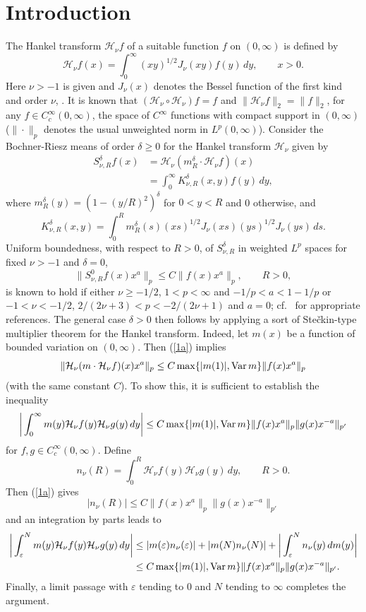\documentclass[leqno,a4paper]{amsart}
\newcommand{\Var}{\mathop{\rm Var}\nolimits}
\begin{document}
\section{Introduction}
The Hankel transform ${\mathcal H}_\nu f$ of a suitable function $f$ on
$(0,\infty)$ is defined by
$$
{\mathcal H}_\nu f(x)
= \int_0^\infty (xy)^{1/2}J_\nu(xy)f(y)\,dy,\qquad x>0.
$$
Here $\nu>-1$ is given and $J_\nu(x)$ denotes the Bessel function of the
first kind and order $\nu$, \cite{Le}. It is known that
$({\mathcal H}_\nu\circ{\mathcal H}_\nu)f=f$ and $\|{\mathcal H}_\nu
f\|_2=\|f\|_2$, for any
$f\in C_c^\infty(0,\infty)$, the space of $C^\infty$ functions with
compact support in $(0,\infty)$ ($\|\cdot\|_p$ denotes the usual unweighted
norm in $L^p(0,\infty)$). Consider the Bochner-Riesz means
of order $\delta\ge0$ for the Hankel transform ${\mathcal H}_\nu$ given by
\begin{align*}
S_{\nu,R}^\delta f(x)
&= {\mathcal H}_\nu(m_R^\delta
\cdot{\mathcal H}_\nu f)(x)\\
&= \int_0^\infty K_{\nu,R}^\delta(x,y)f(y)\,dy,
\end{align*}
where $m_R^\delta(y)=(1-(y/R)^2)^\delta$ for $0<y<R$ and 0 otherwise, and
\begin{equation*}
K^{\delta}_{\nu,R}(x,y) = \int_0^R m_R^\delta(s)
(xs)^{1/2}J_\nu(xs)(ys)^{1/2}J_\nu(ys)\, ds.
\end{equation*}
Uniform boundedness, with respect to $R>0$, of $S_{\nu,R}^\delta$ in weighted
$L^{p}$ spaces for fixed $\nu>-1$ and $\delta=0$,
\begin{equation}
\|S_{\nu,R}^0 f(x)x^a\|_{p}\le C\|f(x)x^a\|_{p},\qquad R>0,
\label{1a}
\end{equation}
is known to hold if either $\nu\ge-1/2$, $1<p<\infty$ and $-1/p<a<1-1/p$
or $-1<\nu<-1/2$, $2/(2\nu+3)<p<-2/(2\nu+1)$ and $a=0$; cf.~\cite{St}
for appropriate references. The general case $\delta>0$ then
follows by applying a sort of Ste\v ckin-type multiplier theorem for the Hankel
transform. Indeed, let $m(x)$ be a function of bounded variation
on $(0,\infty)$. Then (\ref{1a}) implies
$$
\|{\mathcal H}_\nu(m\cdot{\mathcal H}_\nu f)(x)x^a\|_p\le C\max\{|m(1)|,
\Var m\}\|f(x)x^a\|_{p}
$$
(with the same constant $C$). To show this, it is sufficient to establish
the inequality
$$
\bigg|\int_0^\infty m(y){\mathcal H}_\nu f(y){\mathcal H}_\nu g(y)\,dy\bigg|
\le C\max\{|m(1)|,\Var m\}\|f(x)x^a\|_p\|g(x)x^{-a}\|_{p'}
$$
for $f,g\in C_c^\infty(0,\infty)$. Define
$$
n_\nu(R)=\int_0^R{\mathcal H}_\nu f(y){\mathcal H}_\nu g(y)\,dy, \qquad R>0.
$$
Then (\ref{1a}) gives
$$
|n_\nu(R)|\le C\|f(x)x^a\|_p\|g(x)x^{-a}\|_{p'}
$$
and an integration by parts leads to
\begin{align*}
\bigg|\int_\varepsilon^N m(y){\mathcal H}_\nu f(y){\mathcal H}_\nu g(y)\,dy\bigg|
&\le |m(\varepsilon)n_\nu(\varepsilon)|+|m(N)n_\nu(N)|
+\bigg|\int_\varepsilon^N n_\nu(y)\,dm(y)\bigg|\\
&\le C\max\{|m(1)|,\Var m\}\|f(x)x^a\|_p\|g(x)x^{-a}\|_{p'}.
\end{align*}
Finally, a limit passage with $\varepsilon$ tending to 0 and $N$ tending to
$\infty$ completes the argument.
\end{document}
